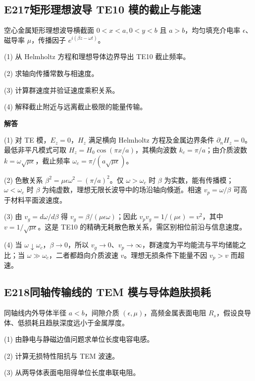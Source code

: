 \subsection*{E217\quad 矩形理想波导 TE10 模的截止与能速}

空心金属矩形理想波导横截面 $0<x<a,0<y<b$ 且 $a>b$，均匀填充介电率 $\epsilon$、磁导率 $\mu$，传播因子 $e^{i(\beta z-\omega t)}$。

(1) 从 Helmholtz 方程和理想导体边界导出 TE10 截止频率。

(2) 求轴向传播常数与相速度。

(3) 计算群速度并验证速度乘积关系。

(4) 解释截止附近与远离截止极限的能量传输。

\par\textbf{解答}

(1) 对 TE 模，$E_z=0$，$H_z$ 满足横向 Helmholtz 方程及金属边界条件 $\partial_nH_z=0$。最低非平凡模式可取 $H_z=H_0\cos(\pi x/a)$，其横向波数 $k_c=\pi/a$；由介质波数 $k=\omega\sqrt{\mu\epsilon}$，截止频率 $\omega_c=\pi/(a\sqrt{\mu\epsilon})$。

(2) 色散关系 $\beta^2=\mu\epsilon\omega^2-(\pi/a)^2$。仅 $\omega>\omega_c$ 时 $\beta$ 为实数，能有传播模；$\omega<\omega_c$ 时 $\beta$ 为纯虚数，理想无限长波导中的场沿轴向倏逝。相速 $v_p=\omega/\beta$ 可高于材料平面波速度。

(3) 由 $v_g=d\omega/d\beta$ 得 $v_g=\beta/(\mu\epsilon\omega)$；因此 $v_pv_g=1/(\mu\epsilon)=v^2$，其中 $v=1/\sqrt{\mu\epsilon}$。这是 TE10 的精确无耗散色散关系，需区别相位前沿与信息速度。

(4) 当 $\omega\downarrow\omega_c$，$\beta\to0$，所以 $v_g\to0$、$v_p\to\infty$，群速度为平均能流与平均储能之比；当 $\omega\gg\omega_c$，二者都趋向介质波速 $v$。理想无损条件下能量不因 $v_p>v$ 而超速。

\par\medskip

\subsection*{E218\quad 同轴传输线的 TEM 模与导体趋肤损耗}

同轴线内外导体半径 $a<b$，间隙介质 $(\epsilon,\mu)$，高频金属表面电阻 $R_s$，假设良导体、低损耗且趋肤深度远小于金属厚度。

(1) 由静电与静磁边值问题求单位长度电容电感。

(2) 计算无损特性阻抗与 TEM 波速。

(3) 从两导体表面电阻得单位长度串联电阻。

